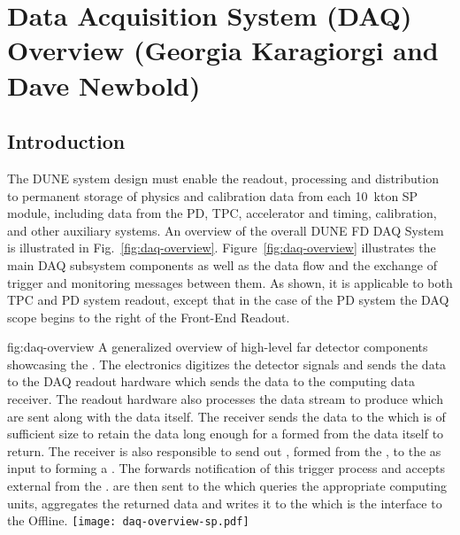 \section{Data Acquisition System (DAQ) Overview (Georgia Karagiorgi and Dave Newbold)}
\label{sec:fdsp-daq-ov}


\subsection{Introduction}
\label{sec:fdsp-daq-intro}

The DUNE    system
design must enable the readout, processing and distribution to
permanent storage of physics and calibration data from each 10~kton SP
module, including data from the PD, TPC, accelerator and timing,
calibration, and other auxiliary systems.
An overview of the overall DUNE FD DAQ System is illustrated in
Fig.~\ref{fig:daq-overview}. 
Figure~\ref{fig:daq-overview} illustrates the main DAQ subsystem
components as well as the data flow and the exchange of trigger and
monitoring messages between them.
As shown, it is applicable to both TPC and PD system readout, except
that in the case of the PD system the DAQ scope begins to the right of
the Front-End Readout. 

\begin{dunefigure}{fig:daq-overview}
  {A generalized overview of high-level far detector 
    components showcasing the  . 
    The electronics digitizes the detector signals and sends the data
    to the DAQ  readout hardware which sends the data to the
     computing data receiver.
    The  readout hardware also processes the data stream to
    produce  which are sent along with the data
    itself.
    The receiver sends the data to the  which is of
    sufficient size to retain the data long enough for a
     formed from the data itself to return.
    The receiver is also responsible to send out
    , formed from the , to
    the  as input to forming a . 
    The  forwards notification of this trigger process and
    accepts external  from the .
     are then sent to the  which queries
    the appropriate  computing units, aggregates the
    returned data and writes it to the  which is the
    interface to the Offline.}
\texttt{[image: daq-overview-sp.pdf]}%
\end{dunefigure}


